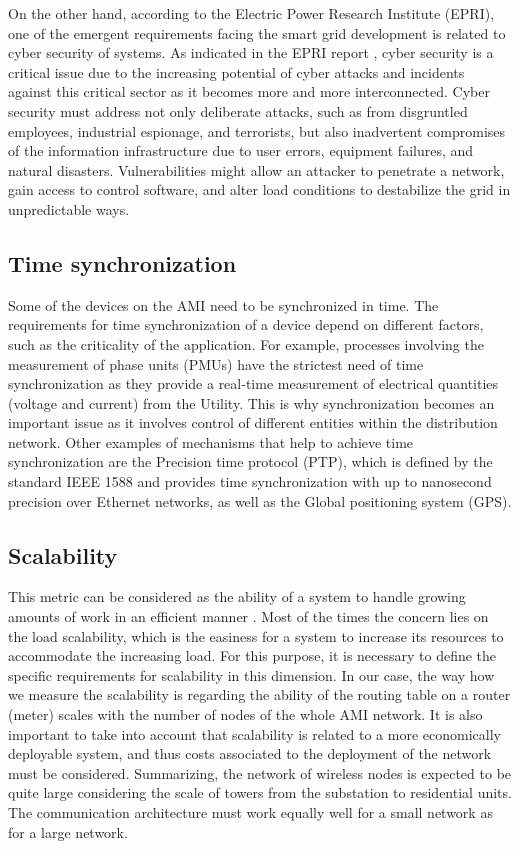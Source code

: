 \documentclass[11pt,final,onecolumn]{IEEEtran}
\begin{document}
On the other hand, according to the Electric Power Research Institute (EPRI), one of the emergent requirements facing the smart grid development is related to cyber security of systems. As indicated in the EPRI report \cite{EPRI2009}, cyber security is a critical issue due to the increasing potential of cyber attacks and incidents against this critical sector as it becomes more and more interconnected. Cyber security must address not only deliberate attacks, such as from disgruntled employees, industrial espionage, and terrorists, but also inadvertent compromises of the information infrastructure due to user errors, equipment failures, and natural disasters. Vulnerabilities might allow an attacker to penetrate a network, gain access to control software, and alter load conditions to destabilize the grid in unpredictable ways.

\subsection{Time synchronization}
Some of the devices on the AMI need to be synchronized in time. The requirements for time synchronization of a device depend on different factors, such as the criticality of the application. For example, processes involving the measurement of phase units (PMUs) have the strictest need of time synchronization as they provide a real-time measurement of electrical quantities (voltage and current) from the Utility. This is why synchronization becomes an important issue as it involves control of different entities within the distribution network. Other examples of mechanisms that help to achieve time synchronization are the Precision time protocol (PTP), which is defined by the standard IEEE 1588 and provides time synchronization with up to nanosecond precision over Ethernet networks, as well as the Global positioning system (GPS).

\subsection{Scalability}
This metric can be considered as the ability of a system to handle growing amounts of work in an efficient manner \cite{Zhou2012}. Most of the times the concern lies on the load scalability, which is the easiness for a system to increase its resources to accommodate the increasing load. For this purpose, it is necessary to define the specific requirements for scalability in this dimension. In our case, the way how we measure the scalability is regarding the ability of the routing table on a router (meter) scales with the number of nodes of the whole AMI network. It is also important to take into account that scalability is related to a more economically deployable system, and thus costs associated to the deployment of the network must be considered. Summarizing, the network of wireless nodes is expected to be quite large considering the scale of towers from the substation to residential units. The communication architecture must work equally well for a small network as for a large network.
\end{document}
